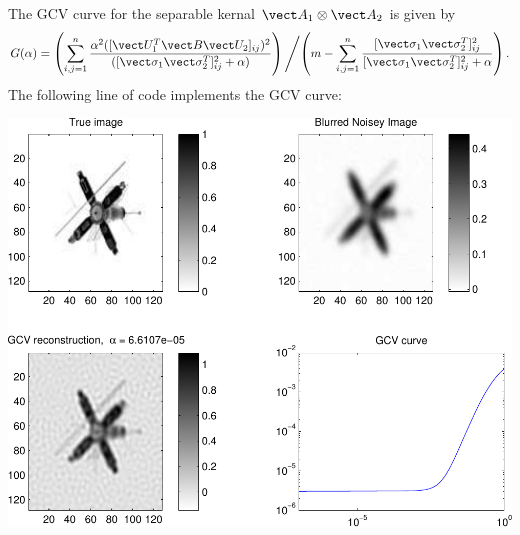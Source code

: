 \documentclass{homework}
\begin{document}
\begin{solution}
  The GCV curve for the separable kernal $\vect A_1\otimes \vect A_2$ is given by
  $$
  G(\alpha) = \left(\sum_{i,j=1}^n \frac{\alpha^2([\vect U_1^T \vect B\vect U_2]_{ij})^2}{([\vect \sigma_1\vect \sigma_2^T]_{ij}^2 + \alpha)} \right) \left/ \middle( m - \sum_{i,j=1}^n\frac{[\vect \sigma_1\vect \sigma_2^T]_{ij}^2}{[\vect \sigma_1\vect \sigma_2^T]_{ij}^2 + \alpha} \right).
  $$
  The following line of code implements the GCV curve:
  

  \includegraphics[width=.75\textwidth]{images.pdf}

\end{solution}
\end{document}
